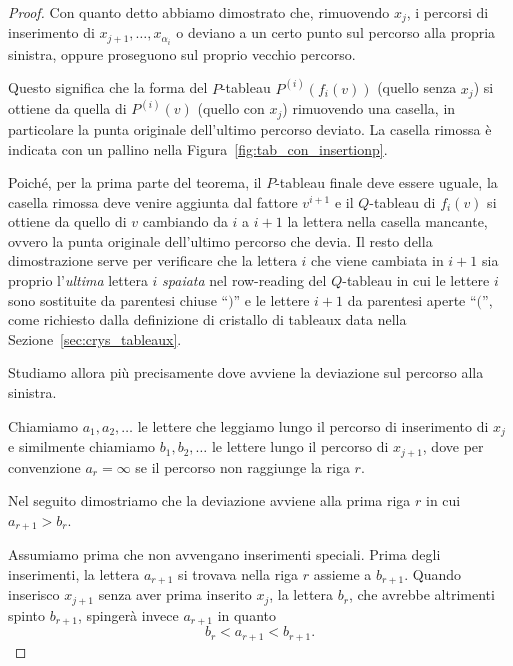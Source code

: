 \begin{proof}
    Con quanto detto abbiamo dimostrato che, rimuovendo $x_j$, i percorsi di inserimento
    di $x_{j+1}, \dots, x_{\alpha_i}$ o deviano a un certo punto sul percorso alla propria
    sinistra, oppure proseguono sul proprio vecchio percorso.

    Questo significa che la forma del $P$-tableau $P^{(i)}(f_i(v))$
    (quello senza $x_j$) si ottiene da quella di $P^{(i)}(v)$ (quello con $x_j$)
    rimuovendo una casella, in particolare la punta originale dell'ultimo percorso
    deviato.
    La casella rimossa \`e indicata con un pallino nella Figura~\ref{fig:tab_con_insertionp}.

    Poich\'e, per la prima parte del teorema, il $P$-tableau finale deve essere uguale,
    la casella rimossa deve venire aggiunta dal fattore $v^{i+1}$ e il $Q$-tableau
    di $f_i(v)$ si ottiene da quello di $v$ cambiando da $i$ a $i+1$ la lettera 
    nella casella mancante, ovvero la punta originale dell'ultimo percorso che devia.
    Il resto della dimostrazione serve per verificare che la lettera $i$ che viene
    cambiata in $i+1$ sia proprio l'\emph{ultima} lettera $i$ \emph{spaiata} nel 
    row-reading del $Q$-tableau in cui le lettere $i$ sono sostituite da parentesi
    chiuse ``$)$'' e le lettere $i+1$ da parentesi aperte ``$\lparen$'',
    come richiesto dalla definizione di cristallo di tableaux data nella 
    Sezione~\ref{sec:crys_tableaux}.

    Studiamo allora pi\`u precisamente dove avviene la deviazione sul percorso alla
    sinistra.

    Chiamiamo $a_1, a_2, \dots$ le lettere che leggiamo lungo il percorso di inserimento
    di $x_j$ e similmente chiamiamo $b_1, b_2, \dots$ le lettere lungo il percorso di $x_{j+1}$,
    dove per convenzione $a_r = \infty$ se il percorso non raggiunge la riga $r$.

    Nel seguito dimostriamo che la deviazione avviene 
    alla prima riga $r$ in cui $a_{r+1} > b_r$.

    Assumiamo prima che non avvengano inserimenti speciali.
    Prima degli inserimenti, la lettera $a_{r+1}$ si trovava nella riga $r$
    assieme a $b_{r+1}$.
    Quando inserisco $x_{j+1}$ senza aver prima inserito $x_j$, la lettera $b_r$, che
    avrebbe altrimenti spinto $b_{r+1}$, spinger\`a invece $a_{r+1}$ in quanto
    \[
        b_r < a_{r+1} < b_{r+1}.
    \]


\end{proof}
